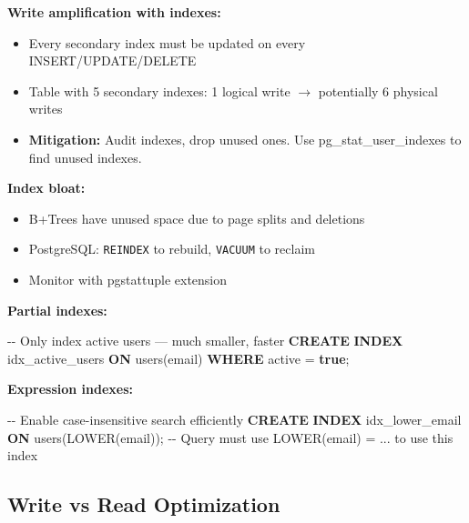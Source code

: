 \documentclass[11pt]{article}
\providecommand{\tightlist}{\setlength{\itemsep}{1pt}\setlength{\parskip}{0pt}}
\newenvironment{Shaded}{\begin{snugshade}}{\end{snugshade}}
\newcommand{\CommentTok}[1]{\textcolor[rgb]{0.48,0.49,0.49}{#1}}
\newcommand{\FunctionTok}[1]{\textcolor[rgb]{0.56,0.27,0.68}{#1}}
\newcommand{\KeywordTok}[1]{\textcolor[rgb]{0.81,0.81,0.76}{\textbf{#1}}}
\newcommand{\NormalTok}[1]{\textcolor[rgb]{0.81,0.81,0.76}{#1}}
\newcommand{\OperatorTok}[1]{\textcolor[rgb]{0.81,0.81,0.76}{#1}}
\begin{document}
\textbf{Write amplification with indexes:}

\begin{itemize}
\tightlist
\item
  Every secondary index must be updated on every INSERT/UPDATE/DELETE
\item
  Table with 5 secondary indexes: 1 logical write \(\rightarrow\) potentially 6 physical writes
\item
  \textbf{Mitigation:} Audit indexes, drop unused ones. Use pg\_stat\_user\_indexes to find unused indexes.
\end{itemize}

\textbf{Index bloat:}

\begin{itemize}
\tightlist
\item
  B+Trees have unused space due to page splits and deletions
\item
  PostgreSQL: \texttt{REINDEX} to rebuild, \texttt{VACUUM} to reclaim
\item
  Monitor with pgstattuple extension
\end{itemize}

\textbf{Partial indexes:}


\begin{Shaded}
\begin{Highlighting}[]
\CommentTok{{-}{-} Only index active users — much smaller, faster}
\KeywordTok{CREATE} \KeywordTok{INDEX}\NormalTok{ idx\_active\_users }\KeywordTok{ON}\NormalTok{ users(email) }\KeywordTok{WHERE}\NormalTok{ active }\OperatorTok{=} \KeywordTok{true}\NormalTok{;}
\end{Highlighting}
\end{Shaded}

\textbf{Expression indexes:}


\begin{Shaded}
\begin{Highlighting}[]
\CommentTok{{-}{-} Enable case{-}insensitive search efficiently}
\KeywordTok{CREATE} \KeywordTok{INDEX}\NormalTok{ idx\_lower\_email }\KeywordTok{ON}\NormalTok{ users(}\FunctionTok{LOWER}\NormalTok{(email));}
\CommentTok{{-}{-} Query must use LOWER(email) = \textquotesingle{}...\textquotesingle{} to use this index}
\end{Highlighting}
\end{Shaded}

\subsection{Write vs Read Optimization}\label{write-vs-read-optimization}
\end{document}
